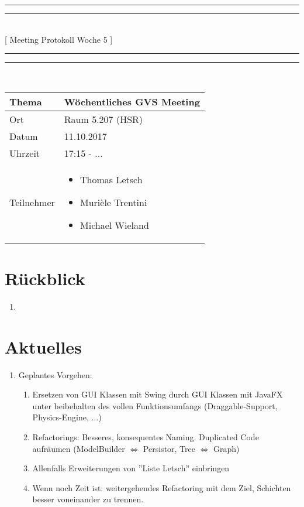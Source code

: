 \documentclass[11pt, a4paper,oneside]{scrartcl}
\begin{document}
\centering
\rule{\textwidth}{1.6pt}\vspace*{-\baselineskip}\vspace*{2pt} %
\rule{\textwidth}{0.4pt}\\[\baselineskip] %
{\LARGE [ Meeting Protokoll Woche 5 ]}\\[0.2\baselineskip] %
\rule{\textwidth}{0.4pt}\vspace*{-\baselineskip}\vspace{3.2pt} %
\rule{\textwidth}{1.6pt}\\[2\baselineskip] %

\begin{tabu} to \linewidth {l X }
	\toprule
	\textbf{Thema} & \textbf{Wöchentliches GVS Meeting} \\
	\midrule
	Ort & Raum 5.207 (HSR) \\
	Datum & 11.10.2017 \\
	Uhrzeit & 17:15 - ... \\
	Teilnehmer & 
	\begin{minipage}[t]{\textwidth}
	  	\begin{itemize}
	  		\item Thomas Letsch
			\item Murièle Trentini
			\item Michael Wieland
	  	\end{itemize}
	\end{minipage}
	\\
	\bottomrule
\end{tabu}


\section{Rückblick}
\begin{enumerate}
	\item 
\end{enumerate}

\section{Aktuelles}
\begin{enumerate}
	\item Geplantes Vorgehen:
	\begin{enumerate}
		\item Ersetzen von GUI Klassen mit Swing durch GUI Klassen mit JavaFX unter beibehalten des vollen Funktionsumfangs (Draggable-Support, Physics-Engine, ...)
		\item Refactorings: Besseres, konsequentes Naming. Duplicated Code aufräumen (ModelBuilder $\Leftrightarrow$ Persistor, Tree $\Leftrightarrow$ Graph)
		\item Allenfalls Erweiterungen von ''Liste Letsch'' einbringen
		\item Wenn noch Zeit ist: weitergehendes Refactoring mit dem Ziel, Schichten besser voneinander zu trennen.
	\end{enumerate}
\end{enumerate}
\end{document}
